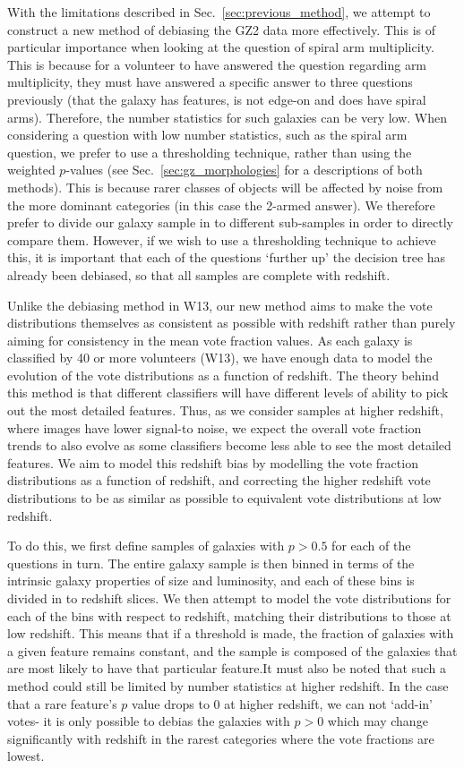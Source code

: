 \documentclass[useAMS,usenatbib]{mn2e}
\begin{document}
With the limitations described in Sec.~\ref{sec:previous_method}, we attempt to construct a new method of debiasing the GZ2 data more effectively. This is of particular importance when looking at the question of spiral arm multiplicity. This is because for a volunteer to have answered the question regarding arm multiplicity, they must have answered a specific answer to three questions previously (that the galaxy has features, is not edge-on and does have spiral arms). Therefore, the number statistics for such galaxies can be very low. When considering a question with low number statistics, such as the spiral arm question, we prefer to use a thresholding technique, rather than using the weighted $p$-values (see Sec.~\ref{sec:gz_morphologies} for a descriptions of both methods). This is because rarer classes of objects will be affected by noise from the more dominant categories (in this case the 2-armed answer). We therefore prefer to divide our galaxy sample in to different sub-samples in order to directly compare them. However, if we wish to use a thresholding technique to achieve this, it is important that each of the questions `further up' the decision tree has already been debiased, so that all samples are complete with redshift.

Unlike the debiasing method in W13, our new method aims to make the vote distributions themselves as consistent as possible with redshift rather than purely aiming for consistency in the mean vote fraction values. As each galaxy is classified by 40 or more volunteers (W13), we have enough data to model the evolution of the vote distributions as a function of redshift. The theory behind this method is that different classifiers will have different levels of ability to pick out the most detailed features. Thus, as we consider samples at higher redshift, where images have lower signal-to noise, we expect the overall vote fraction trends to also evolve as some classifiers become less able to see the most detailed features. We aim to model this redshift bias by modelling the vote fraction distributions as a function of redshift, and correcting the higher redshift vote distributions to be as similar as possible to equivalent vote distributions at low redshift. 

To do this, we first define samples of galaxies with $p>0.5$ for each of the questions in turn. The entire galaxy sample is then binned in terms of the intrinsic galaxy properties of size and luminosity, and each of these bins is divided in to redshift slices. We then attempt to model the vote distributions for each of the bins with respect to redshift, matching their distributions to those at low redshift. This means that if a threshold is made, the fraction of galaxies with a given feature remains constant, and the sample is composed of the galaxies that are most likely to have that particular feature.It must also be noted that such a method could still be limited by number statistics at higher redshift. In the case that a rare feature's $p$ value drops to 0 at higher redshift, we can not `add-in' votes- it is only possible to debias the galaxies with $p>0$ which may change significantly with redshift in the rarest categories where the vote fractions are lowest.
\end{document}
